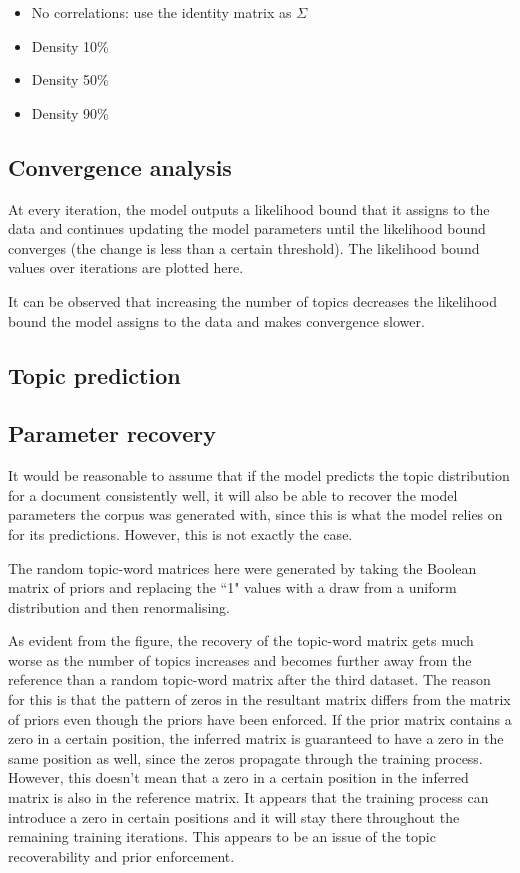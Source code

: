 \documentclass[12pt,a4paper,twoside,openright]{report}
\begin{document}
\begin{itemize}[noitemsep]
\item No correlations: use the identity matrix as $\Sigma$
\item Density 10\%
\item Density 50\%
\item Density 90\%
\end{itemize}

\subsection{Convergence analysis}

At every iteration, the model outputs a likelihood bound that it assigns to the data and continues updating the model parameters until the likelihood bound converges (the change is less than a certain threshold). The likelihood bound values over iterations are plotted here.

It can be observed that increasing the number of topics decreases the likelihood bound the model assigns to the data and makes convergence slower.

\subsection{Topic prediction}

\subsection{Parameter recovery}

It would be reasonable to assume that if the model predicts the topic distribution for a document consistently well, it will also be able to recover the model parameters the corpus was generated with, since this is what the model relies on for its predictions. However, this is not exactly the case.

The random topic-word matrices here were generated by taking the Boolean matrix of priors and replacing the ``1" values with a draw from a uniform distribution and then renormalising.

As evident from the figure, the recovery of the topic-word matrix gets much worse as the number of topics increases and becomes further away from the reference than a random topic-word matrix after the third dataset. The reason for this is that the pattern of zeros in the resultant matrix differs from the matrix of priors even though the priors have been enforced. If the prior matrix contains a zero in a certain position, the inferred matrix is guaranteed to have a zero in the same position as well, since the zeros propagate through the training process. However, this doesn't mean that a zero in a certain position in the inferred matrix is also in the reference matrix. It appears that the training process can introduce a zero in certain positions and it will stay there throughout the remaining training iterations. This appears to be an issue of the topic recoverability and prior enforcement.
\end{document}
